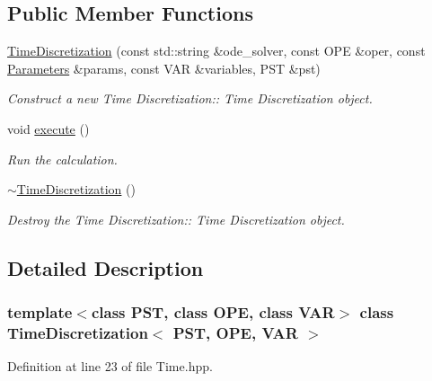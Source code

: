 \subsection*{Public Member Functions}
\begin{DoxyCompactItemize}
\item 
\hyperlink{classTimeDiscretization_a04acc6d99c77872e59ff39670b9f0c57}{Time\+Discretization} (const std\+::string \&ode\+\_\+solver, const O\+PE \&oper, const \hyperlink{classParameters}{Parameters} \&params, const V\+AR \&variables, P\+ST \&pst)
\begin{DoxyCompactList}\small\item\em Construct a new Time Discretization\+:\+: Time Discretization object. \end{DoxyCompactList}\item 
\mbox{\label{classTimeDiscretization_ae6a52d8b302e8e9f721e00cf4bf64e8c}} 
void \hyperlink{classTimeDiscretization_ae6a52d8b302e8e9f721e00cf4bf64e8c}{execute} ()
\begin{DoxyCompactList}\small\item\em Run the calculation. \end{DoxyCompactList}\item 
\mbox{\label{classTimeDiscretization_aac54cfc0fcd36d7e9b7aefe8db96f9e8}} 
\hyperlink{classTimeDiscretization_aac54cfc0fcd36d7e9b7aefe8db96f9e8}{$\sim$\+Time\+Discretization} ()
\begin{DoxyCompactList}\small\item\em Destroy the Time Discretization\+:\+: Time Discretization object. \end{DoxyCompactList}\end{DoxyCompactItemize}


\subsection{Detailed Description}
\subsubsection*{template$<$class P\+ST, class O\+PE, class V\+AR$>$\newline
class Time\+Discretization$<$ P\+S\+T, O\+P\+E, V\+A\+R $>$}



Definition at line 23 of file Time.\+hpp.




